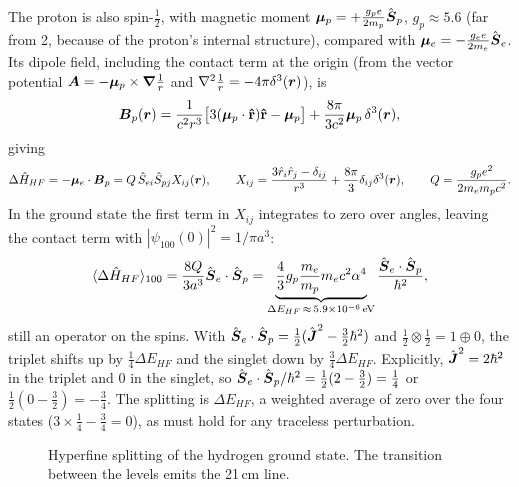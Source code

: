 The proton is also spin-$\frac12$, with magnetic moment $\bm{\mu}_p = +\frac{g_pe}{2m_p}\hat{\vect{S}}_p$, $g_p\approx5.6$ (far from 2, because of the proton's internal structure), compared with $\bm{\mu}_e = -\frac{g_ee}{2m_e}\hat{\vect{S}}_e$. Its dipole field, including the contact term at the origin (from the vector potential $\vect{A} = -\bm{\mu}_p\times\grad\frac1r$ and $\laplacian\frac1r = -4\pi\delta^3(\lvect{r})$), is
\[
    \vect{B}_p(\lvect{r}) = \frac{1}{c^2r^3}\bigl[3(\bm{\mu}_p\cdot\rhat)\rhat - \bm{\mu}_p\bigr] + \frac{8\pi}{3c^2}\bm{\mu}_p\,\delta^3(\lvect{r}),
\]
giving
\[
    \Delta\hat{H}_{HF} = -\bm{\mu}_e\cdot\vect{B}_p = Q\,\hat{S}_{ei}\hat{S}_{pj}X_{ij}(\lvect{r}),
    \qquad
    X_{ij} = \frac{3\hat{r}_i\hat{r}_j - \delta_{ij}}{r^3} + \frac{8\pi}{3}\delta_{ij}\delta^3(\lvect{r}),
    \qquad
    Q = \frac{g_pe^2}{2m_em_pc^2}.
\]
In the ground state the first term in $X_{ij}$ integrates to zero over angles, leaving the contact term with $|\psi_{100}(0)|^2 = 1/\pi a^3$:
\[
    \langle\Delta\hat{H}_{HF}\rangle_{100} = \frac{8Q}{3a^3}\hat{\vect{S}}_e\cdot\hat{\vect{S}}_p = \underbrace{\frac43g_p\frac{m_e}{m_p}m_ec^2\alpha^4}_{\Delta E_{HF}\,\approx\,5.9\times10^{-6}\,\text{eV}}\frac{\hat{\vect{S}}_e\cdot\hat{\vect{S}}_p}{\hbar^2},
\]
still an operator on the spins. With $\hat{\vect{S}}_e\cdot\hat{\vect{S}}_p = \frac12(\hat{\vect{J}}^2 - \frac32\hbar^2)$ and $\frac12\otimes\frac12 = 1\oplus0$, the triplet shifts up by $\frac14\Delta E_{HF}$ and the singlet down by $\frac34\Delta E_{HF}$. Explicitly, $\hat{\vect{J}}^2 = 2\hbar^2$ in the triplet and $0$ in the singlet, so $\hat{\vect{S}}_e\cdot\hat{\vect{S}}_p/\hbar^2 = \frac12(2-\frac32) = \frac14$ or $\frac12(0-\frac32) = -\frac34$. The splitting is $\Delta E_{HF}$, a weighted average of zero over the four states ($3\times\frac14 - \frac34 = 0$), as must hold for any traceless perturbation.

\begin{figure}[ht]
\centering
{}
\caption{Hyperfine splitting of the hydrogen ground state. The transition between the levels emits the 21\,cm line.}
\end{figure}


